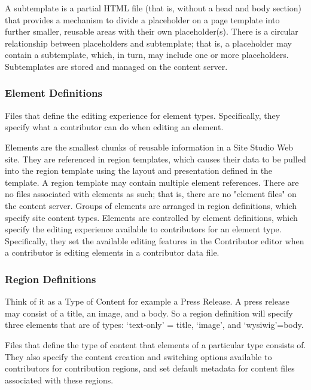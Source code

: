 A subtemplate is a partial HTML file (that is, without a head and body
section) that provides a mechanism to divide a placeholder on a page
template into further smaller, reusable areas with their own
placeholder(s). There is a circular relationship between placeholders
and subtemplate; that is, a placeholder may contain a subtemplate,
which, in turn, may include one or more placeholders. Subtemplates are
stored and managed on the content server.

\subsubsection{Element Definitions}

Files that define the editing experience for element
types. Specifically, they specify what a contributor can do when
editing an element.

Elements are the smallest chunks of reusable information in a Site
Studio Web site. They are referenced in region templates, which causes
their data to be pulled into the region template using the layout and
presentation defined in the template. A region template may contain
multiple element references. There are no files associated with
elements as such; that is, there are no "element files" on the content
server. Groups of elements are arranged in region definitions, which
specify site content types. Elements are controlled by element
definitions, which specify the editing experience available to
contributors for an element type. Specifically, they set the available
editing features in the Contributor editor when a contributor is
editing elements in a contributor data file.


\subsubsection{Region Definitions}

Think of it as a Type of Content for example a Press Release.  A press release may consist of a title, an image, and a body.  So a region definition will specify three elements that are of types: ‘text-only’ = title, ‘image’, and ‘wysiwig’=body.

Files that define the type of content that elements of a particular type consists of. They also specify the content creation and switching options available to contributors for contribution regions, and set default metadata for content files associated with these regions.

